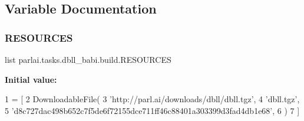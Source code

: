 \subsection{Variable Documentation}
\mbox{\label{namespaceparlai_1_1tasks_1_1dbll__babi_1_1build_a37514f5c86d5523b75f341f02bac1f6f}} 
\subsubsection{\texorpdfstring{R\+E\+S\+O\+U\+R\+C\+ES}{RESOURCES}}
{\footnotesize\ttfamily list parlai.\+tasks.\+dbll\+\_\+babi.\+build.\+R\+E\+S\+O\+U\+R\+C\+ES}

{\bfseries Initial value\+:}
\begin{DoxyCode}
1 =  [
2     DownloadableFile(
3         \textcolor{stringliteral}{'http://parl.ai/downloads/dbll/dbll.tgz'},
4         \textcolor{stringliteral}{'dbll.tgz'},
5         \textcolor{stringliteral}{'d8c727dac498b652c7f5de6f72155dce711ff46c88401a303399d3fad4db1e68'},
6     )
7 ]
\end{DoxyCode}
